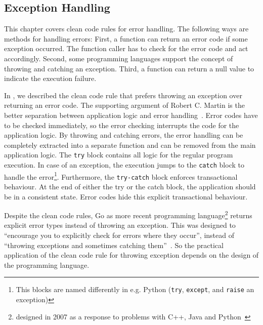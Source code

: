 \subsection{Exception Handling}\label{sec:background:returning_none_and_error_handling}
This chapter covers clean code rules for error handling. The following ways are methods for handling errors:
First, a function can return an error code if some exception occurred. The function caller has to check for the error code and act accordingly. Second, some programming languages support the concept of throwing and catching an exception. Third, a function can return a null value to indicate the execution failure. 

In , we described the clean code rule that prefers throwing an exception over returning an error code. The supporting argument of Robert C. Martin is the better separation between application logic and error handling~\cite{martin_clean_2009}. Error codes have to be checked immediately, so the error checking interrupts the code for the application logic. By throwing and catching errors, the error handling can be completely extracted into a separate function and can be removed from the main application logic. The \texttt{try} block contains all logic for the regular program execution. In case of an exception, the execution jumps to the \texttt{catch} block to handle the error\footnote{This blocks are named differently in e.g. Python (\texttt{try}, \texttt{except}, and \texttt{raise} an exception)}. Furthermore, the \texttt{try-catch} block enforces transactional behaviour. At the end of either the try or the catch block, the application should be in a consistent state. Error codes hide this explicit transactional behaviour. 

Despite the clean code rules, Go as more recent programming language\footnote{designed in 2007 as a response to problems with C++, Java and Python~\cite{noauthor_go_nodate}} returns explicit error types instead of throwing an exception. This was designed to \enquote{encourage you to explicitly check for errors where they occur}, instead of \enquote{throwing exceptions and sometimes catching them}~\cite{gerrand_error_2011}.   
So the practical application of the clean code rule for throwing exception depends on the design of the programming language.

